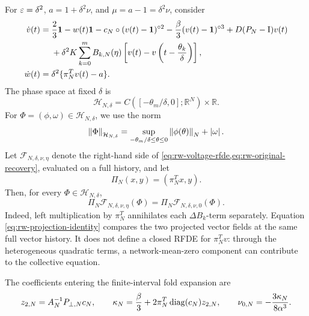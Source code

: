 For \(\varepsilon=\delta^2\), \(a=1+\delta^2\nu\), and
\(\mu=a-1=\delta^2\nu\), consider
\begin{align}
 \dot v(t)={}&\frac23\mathbf1-w(t)\mathbf1
 -c_N\circ(v(t)-\mathbf1)^{\circ2}
 -\frac\beta3(v(t)-\mathbf1)^{\circ3}
 +D(P_N-\mathrm I)v(t)\notag\\
 &+\delta^2K\sum_{k=0}^mB_{k,N}(\eta)
 \left[v(t)-v\left(t-\frac{\theta_k}{\delta}\right)\right],
 \label{eq:rw-voltage-rfde}\\
 \dot w(t)={}&\delta^2\{\pi_N^Tv(t)-a\}.
 \label{eq:rw-original-recovery}
\end{align}
The phase space at fixed \(\delta\) is
\begin{equation}
 \mathcal H_{N,\delta}
 =C([ -\theta_m/\delta,0];\mathbb R^N)\times\mathbb R.
 \label{eq:rw-phase-space}
\end{equation}
For \(\Phi=(\phi,\omega)\in\mathcal H_{N,\delta}\), we use the norm
\begin{equation}
 \left\lVert\Phi\right\rVert_{\mathcal H_{N,\delta}}
 =\sup_{-\theta_m/\delta\leq\theta\leq0}\left\lVert\phi(\theta)\right\rVert_N
   +\left\lvert\omega\right\rvert.
 \label{eq:rw-phase-space-norm}
\end{equation}
Let \(\mathcal F_{N,\delta,\nu,\eta}\) denote the right-hand side of
\cref{eq:rw-voltage-rfde,eq:rw-original-recovery}, evaluated on a full
history, and let
\begin{equation}
 \Pi_N(x,y)=(\pi_N^Tx,y).
 \label{eq:rw-stationary-projection}
\end{equation}
Then, for every \(\Phi\in\mathcal H_{N,\delta}\),
\begin{equation}
 \Pi_N\mathcal F_{N,\delta,\nu,\eta}(\Phi)
 =\Pi_N\mathcal F_{N,\delta,\nu,0}(\Phi).
 \label{eq:rw-projection-identity}
\end{equation}
Indeed, left multiplication by \(\pi_N^T\) annihilates each
\(\Delta B_k\)-term separately.  Equation \eqref{eq:rw-projection-identity}
compares the two projected vector fields at the same full vector history.
It does not define a closed RFDE for \(\pi_N^Tv\): through the heterogeneous
quadratic terms, a network-mean-zero component can contribute to the
collective equation.

The coefficients entering the finite-interval fold expansion are
\begin{equation}
 z_{2,N}=A_N^{-1}P_{\perp,N}c_N,
 \qquad
 \kappa_N=\frac\beta3+2\pi_N^T\operatorname{diag}(c_N)z_{2,N},
 \qquad
 \nu_{0,N}=-\frac{3\kappa_N}{8\alpha^3}.
 \label{eq:rw-fold-center}
\end{equation}

